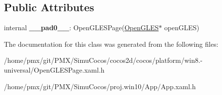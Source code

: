 \subsection*{Public Attributes}
\begin{DoxyCompactItemize}
\item 
\mbox{\label{classCocosAppWinRT_1_1sealed_a63e9e766e8c9cad965ae614108ab9bcb}} 
internal {\bfseries \+\_\+\+\_\+pad0\+\_\+\+\_\+}\+: Open\+G\+L\+E\+S\+Page(\hyperlink{classOpenGLES}{Open\+G\+L\+ES}$\ast$ open\+G\+L\+ES)
\end{DoxyCompactItemize}


The documentation for this class was generated from the following files\+:\begin{DoxyCompactItemize}
\item 
/home/pmx/git/\+P\+M\+X/\+Simu\+Cocos/cocos2d/cocos/platform/win8.-\/universal/Open\+G\+L\+E\+S\+Page.\+xaml.\+h\item 
/home/pmx/git/\+P\+M\+X/\+Simu\+Cocos/proj.\+win10/\+App/App.\+xaml.\+h\end{DoxyCompactItemize}
